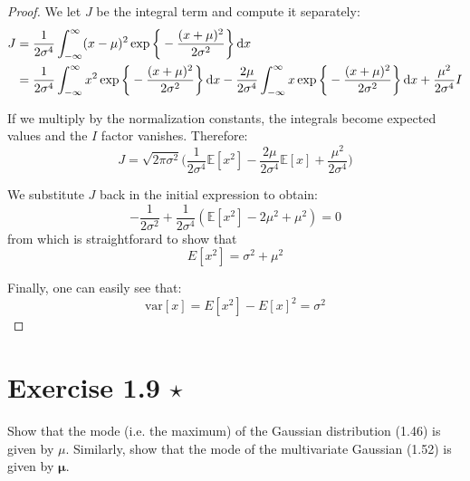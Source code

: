 \begin{proof}
    We let $J$ be the integral term and compute it separately:
    \begin{align*}
        J &= \frac{1}{2\sigma^4} \int_{-\infty}^{\infty} (x - \mu)^2 \exp \bigg\{-\frac{(x + \mu)^2}{2\sigma^2}\bigg\} \mathop{}\!\mathrm{d} x \\
          &= \frac{1}{2\sigma^4} \int_{-\infty}^{\infty} x^2 
            \exp \bigg\{-\frac{(x+\mu)^2}{2\sigma^2}\bigg\} \mathop{}\!\mathrm{d} x
        - \frac{2\mu}{2\sigma^4} \int_{-\infty}^{\infty} x 
            \exp \bigg\{-\frac{(x+\mu)^2}{2\sigma^2}\bigg\} \mathop{}\!\mathrm{d} x
        + \frac{\mu^2}{2\sigma^4} I
    \end{align*}

    If we multiply by the normalization constants, the integrals become expected values and the
    $I$ factor vanishes. Therefore:
    \[
        J = \sqrt{2\pi \sigma^2} \bigg(\frac{1}{2\sigma^4} \mathbb{E}[x^2] - \frac{2\mu}{2\sigma^4} \mathbb{E}[x] + \frac{\mu^2}{2\sigma^4}\bigg)
    \] 

    We substitute $J$ back in the initial expression to obtain:
    \[
        -\frac{1}{2\sigma^2} + \frac{1}{2\sigma^4}(\mathbb{E}[x^2] - 2\mu^2 + \mu^2) = 0
    \] 
    from which is straightforard to show that 
    \begin{equation}\label{eq:1.50}\tag{1.50}
        E[x^2] = \sigma^2 + \mu^2
    \end{equation}

    Finally, one can easily see that:
    \begin{equation}\label{eq:1.51}\tag{1.51}
        \text{var}[x] = E[x^2] - E[x]^2 = \sigma^2
    \end{equation}
\end{proof}

\section*{Exercise 1.9 $\star$}
Show that the mode (i.e. the maximum) of the Gaussian distribution (1.46) is
given by $\mu$. Similarly, show that the mode of the multivariate Gaussian
(1.52) is given by $\bm{\mu}$. 

\vspace{1em}

